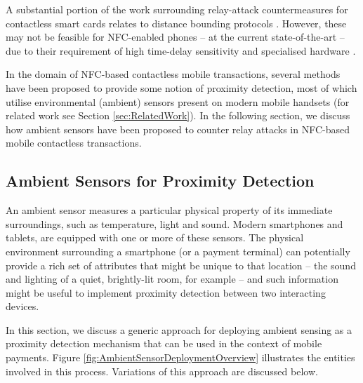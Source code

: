 \documentclass{article}
\begin{document}
A substantial portion of the work surrounding relay-attack countermeasures for contactless smart cards relates to distance bounding protocols \cite{DrimerM07,Francillon11}.  However, these may not be feasible for NFC-enabled phones -- at the current state-of-the-art -- due to their requirement of high time-delay sensitivity and specialised hardware \cite{Coskun2013,Halevi2012}.

In the domain of NFC-based contactless mobile transactions, several methods have been proposed to provide some notion of proximity detection, most of which utilise environmental (ambient) sensors present on modern mobile handsets (for related work see Section \ref{sec:RelatedWork}).  In the following section, we discuss how ambient sensors have been proposed to counter relay attacks in NFC-based mobile contactless transactions. 

\subsection{Ambient Sensors for Proximity Detection}
\label{sec:AmbientSensorsforProximityDetection}
An ambient sensor measures a particular physical property of its immediate surroundings, such as temperature, light and sound.  Modern smartphones and tablets, are equipped with one or more of these sensors.  The physical environment surrounding a smartphone (or a payment terminal) can potentially provide a rich set of attributes that might be unique to that location -- the sound and lighting of a quiet, brightly-lit room, for example -- and such information might be useful to implement proximity detection between two interacting devices.  

In this section, we discuss a generic approach for deploying ambient sensing as a proximity detection mechanism that can be used in the context of mobile payments. Figure \ref{fig:AmbientSensorDeploymentOverview} illustrates the entities involved in this process. Variations of this approach are discussed below.
\end{document}
